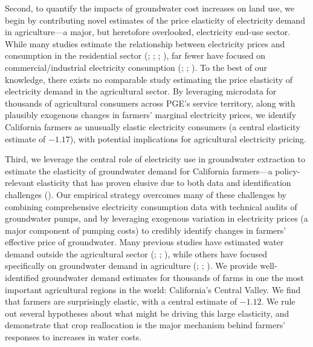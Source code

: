 Second, to quantify the impacts of groundwater cost increases on land use, we begin by contributing novel estimates of the price elasticity of electricity demand in agriculture---a major, but heretofore overlooked, electricity end-use sector. While many studies estimate the relationship between electricity prices and consumption in the residential sector (\textcite{alberini2011}; \textcite{fell2014}; \textcite{ito2014}; \textcite{deryugina2018}), far fewer have focused on commercial/industrial electricity consumption (\textcite{paul2009}; \textcite{jessoe2015}; \textcite{blonz2016}). To the best of our knowledge, there exists no comparable study estimating the price elasticity of electricity demand in the agricultural sector. By leveraging microdata for thousands of agricultural consumers across PGE's service territory, along with plausibly exogenous changes in farmers' marginal electricity prices, we identify California farmers as unusually elastic electricity consumers (a central elasticity estimate of $-1.17$), with potential implications for agricultural electricity pricing. 

Third, we leverage the central role of electricity use in groundwater extraction to estimate the elasticity of groundwater demand for California farmers---a policy-relevant elasticity that has proven elusive due to both data and identification challenges (\textcite{mieno2017}). Our empirical strategy overcomes many of these challenges by combining comprehensive electricity consumption data with technical audits of groundwater pumps, and by leveraging exogenous variation in electricity prices (a major component of pumping costs) to credibly identify changes in farmers' effective price of groundwater. 
Many previous studies have estimated water demand outside the agricultural sector (\textcite{hewitt1995}; \textcite{renwick2000}; \textcite{olmstead2007}), while others have focused specifically on groundwater demand in agriculture (\textcite{hendricks2012}; \textcite{pfeiffer2014}; \textcite{badiani2015}). We provide well-identified groundwater demand estimates for thousands of farms in one the most important agricultural regions in the world: California's Central Valley. We find that farmers are surprisingly elastic, with a central estimate of $-1.12$. We rule out several hypotheses about what might be driving this large elasticity, and demonstrate that crop reallocation is the major mechanism behind farmers' responses to increases in water costs.  


